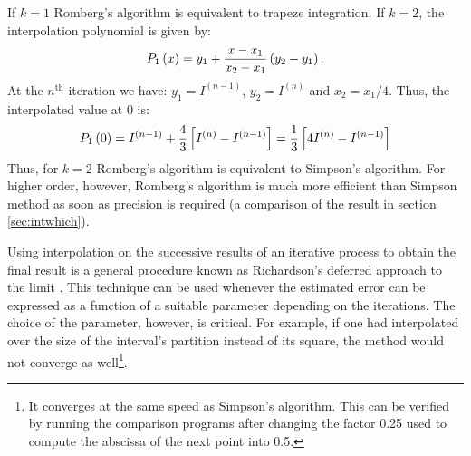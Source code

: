 If $k=1$ Romberg's algorithm is equivalent to trapeze integration.
If $k=2$, the interpolation polynomial is given by:
\begin{equation}
P_1\left(x\right)=y_1+{x-x_1 \over x_2-x_1}\left(y_2-y_1\right).
\end{equation}
At the $n^{\mathop{\textrm{th}}}$ iteration we have:
$y_1=I^{\left(n-1\right)}$, $y_2=I^{\left(n\right)}$ and
$x_2=x_1/4$. Thus, the interpolated value at 0 is:
\begin{equation}
P_1\left(0\right)=I^{\left(n-1\right)}+{4 \over
3}\left[I^{\left(n\right)}-I^{\left(n-1\right)}\right] ={1\over
3}\left[4I^{\left(n\right)}-I^{\left(n-1\right)}\right]
\end{equation}
Thus, for $k=2$ Romberg's algorithm is equivalent to Simpson's
algorithm. For higher order, however, Romberg's algorithm is much
more efficient than Simpson method as soon as precision is
required (\cf a comparison of the result in section
\ref{sec:intwhich}).

Using interpolation on the successive results of an iterative
process to obtain the final result is a general procedure known as
Richardson's deferred approach to the limit \cite{Press}. This
technique can be used whenever the estimated error can be
expressed as a function of a suitable parameter depending on the
iterations. The choice of the parameter, however, is critical. For
example, if one had interpolated over the size of the interval's
partition instead of its square, the method would not converge as
well\footnote{It converges at the same speed as Simpson's
algorithm. This can be verified by running the comparison programs
after changing the factor 0.25 used to compute the abscissa of the
next point into 0.5.}.

